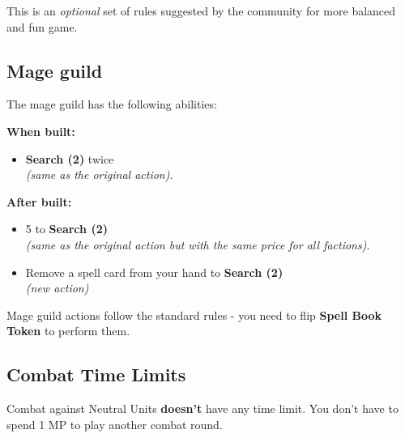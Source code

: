 
\begin{multicols*}{2}

This is an \textit{optional} set of rules suggested by the community for more balanced and fun game.

\subsection*{Mage guild}

The mage guild has the following abilities:

\textbf{When built:}
\begin{itemize}
    \item \textbf{Search (2)} {\spellpower} twice \\ \textit{(same as the original action)}.
\end{itemize}

\textbf{After built:}
\begin{itemize}
    \item {\pay} 5 {\gold} to \textbf{Search (2)} \spellpower \\ \textit{(same as the original action but with the same price for all factions)}.
    \item Remove a spell card from your hand to \textbf{Search (2)} {\spellpower} \\ \textit{(new action)}
\end{itemize}

Mage guild actions follow the standard rules - you need to flip \textbf{Spell Book Token} to perform them.

\subsection*{Combat Time Limits}

Combat against Neutral Units \textbf{doesn't} have any time limit. You don't have to spend 1 MP to play another combat round.

\vfill

\end{multicols*}
